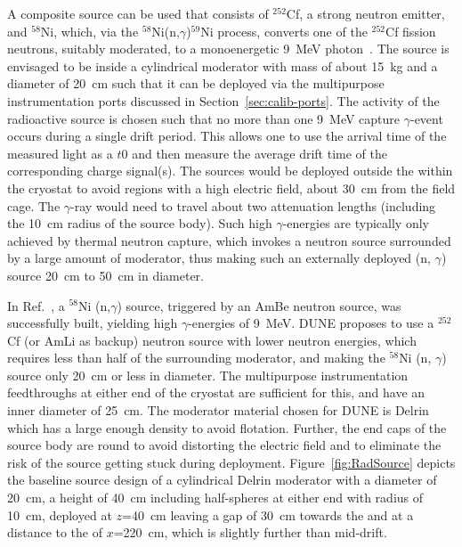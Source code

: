 A composite source can be used that consists  of $^{252}$Cf, a strong neutron emitter, and $^{58}$Ni, which, via the $^{58}$Ni(n,$\gamma$)$^{59}$Ni process, converts one of the $^{252}$Cf fission neutrons, suitably moderated, to a monoenergetic \SI{9}{\MeV} photon~\cite{Rogers:1996ks}. 
The source is envisaged to be inside a cylindrical moderator with mass of about \SI{15}{kg} and a diameter of \SI{20}{\cm} such that it can be deployed via the multipurpose instrumentation ports discussed in Section~\ref{sec:calib-ports}. The activity of the radioactive source is chosen such that no more than one \SI{9}{\MeV} capture $\gamma$-event occurs during a single 
drift period. This allows one to use the arrival time of the measured light as a $t0$ and then measure the average drift time of the corresponding charge signal(s). The sources would be deployed outside the  within the cryostat to avoid regions with a high electric field, about \SI{30}{\cm} from the field cage. The $\gamma$-ray would need
to travel about two attenuation lengths (including the \SI{10}{\cm} radius of the source body). Such high
$\gamma$-energies are typically only achieved by thermal neutron
capture, which invokes a neutron source surrounded by a large
amount of moderator,
thus making such an externally deployed (n, $\gamma$) source \SI{20}{\cm}  to \SI{50}{\cm} %
in diameter. 

In Ref.~\cite{Rogers:1996ks},
a $^{58}$Ni (n,$\gamma$) source, triggered by an AmBe neutron source,
was successfully built, yielding high $\gamma$-energies of \SI{9}{\MeV}. DUNE %
proposes to use a $^{252}$Cf (or AmLi as backup) neutron source with lower
neutron energies, which requires less than half of the surrounding
moderator, and making the $^{58}$Ni (n, $\gamma$) source only
\SI{20}{\cm} or less in diameter. The multipurpose instrumentation
feedthroughs at either end of the cryostat are sufficient for
this, and have an inner diameter of \SI{25}{\cm}.  The moderator
material chosen for DUNE is Delrin which has a large enough
density to avoid flotation. Further, the end caps of the source
body are round to avoid distorting the electric field and to
eliminate the risk of the source getting stuck during deployment. 
Figure~\ref{fig:RadSource} depicts the baseline source design of a
cylindrical Delrin moderator with a diameter of \SI{20}{\cm}, a
height of \SI{40}{\cm} including half-spheres at either end with
radius of \SI{10}{\cm}, deployed at $z$=\SI{40}{\cm} leaving a gap of \SI{30}{\cm} towards the  and at a distance to the  of $x$=\SI{220}{\cm}, 
which is slightly further than mid-drift.

